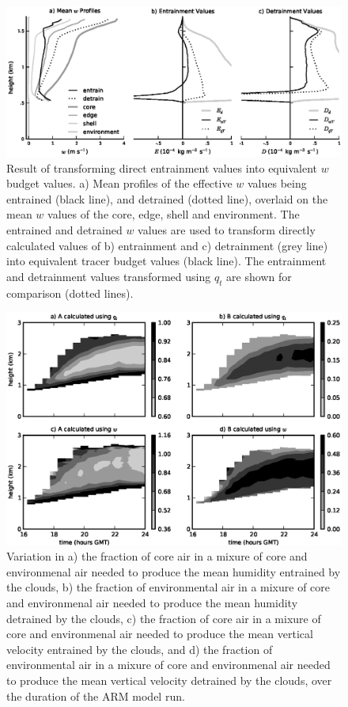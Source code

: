 \documentclass[12pt]{article}
\begin{document}
\begin{figure}[t]
  \noindent\includegraphics[width=39pc]{./figures/reynolds_correction_w}
  \caption{Result of transforming direct entrainment values into 
  equivalent $w$ budget values.  a) Mean profiles of the effective $w$ 
  values being entrained (black line), and detrained (dotted line), 
  overlaid on the mean $w$ values of the core, edge, shell and 
  environment.  The entrained and detrained $w$ values are used to 
  transform directly calculated values of b) entrainment and c) 
  detrainment (grey line) into equivalent tracer budget values 
  (black line).  The entrainment and detrainment values transformed 
  using $q_t$ are shown for comparison (dotted lines).}
  \label{fig:Reynolds_correction_w}
\end{figure}

\begin{figure}[t]
  \noindent\includegraphics[width=39pc]{./figures/shell_variability}
  \caption{Variation in a) the fraction of core air in a mixure of core 
  and environmenal air needed to produce the mean humidity entrained by 
  the clouds, b) the fraction of environmental air in a mixure of core 
  and environmenal air needed to produce the mean humidity detrained by 
  the clouds, c) the fraction of core air in a mixure of core and 
  environmenal air needed to produce the mean vertical velocity 
  entrained by the clouds, and d) the fraction of environmental air in 
  a mixure of core and environmenal air needed to produce the mean 
  vertical velocity detrained by the clouds, over the duration of the 
  ARM model run.
  }
  \label{fig:shell_variability}
\end{figure}
\end{document}
